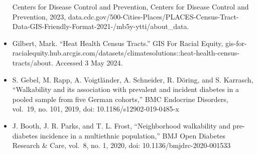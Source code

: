 \documentclass[
]{article}
\begin{document}
\begin{itemize}
  Centers for Disease Control and Prevention, Centers for Disease
  Control and Prevention, 2023,
  data.cdc.gov/500-Cities-Places/PLACES-Census-Tract-Data-GIS-Friendly-Format-2021-/mb5y-ytti/about\_data.
\item
  Gilbert, Mark. ``Heat Health Census Tracts.'' GIS For Racial Equity,
  gis-for-racialequity.hub.arcgis.com/datasets/climatesolutions::heat-health-census-tracts/about.
  Accessed 3 May 2024.
\item
  S. Gebel, M. Rapp, A. Voigtländer, A. Schneider, R. Döring, and S.
  Karrasch, ``Walkability and its association with prevalent and
  incident diabetes in a pooled sample from five German cohorts,'' BMC
  Endocrine Disorders, vol.~19, no. 101, 2019, doi:
  10.1186/s12902-019-0485-x
\item
  J. Booth, J. R. Parks, and T. L. Frost, ``Neighborhood walkability and
  pre-diabetes incidence in a multiethnic population,'' BMJ Open
  Diabetes Research \& Care, vol.~8, no. 1, 2020, doi:
  10.1136/bmjdrc-2020-001533
\end{itemize}
\end{document}
